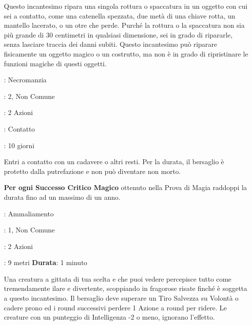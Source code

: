 \begin{multicols}{2}
Questo incantesimo ripara una singola rottura o spaccatura in un oggetto con cui sei a contatto, come una catenella spezzata, due metà di una chiave rotta, un mantello lacerato, o un otre che perde. Purché la rottura o la spaccatura non sia più grande di 30 centimetri in qualsiasi dimensione, sei in grado di ripararle, senza lasciare traccia dei danni subiti. Questo incantesimo può riparare fisicamente un oggetto magico o un costrutto, ma non è in grado di ripristinare le funzioni magiche di questi oggetti.

\noindent\colorbox{OBSSgold!10}{
\begin{minipage}{0.95\linewidth}
\begin{description}[noitemsep, topsep=0pt, parsep=0pt, partopsep=0pt, leftmargin=0cm, labelwidth=1.3cm]
	\item[\textbf{Lista}]: Necromanzia
	\item[\textbf{Livello}]: 2, Non Comune
	\item[\textbf{Lancio}]: 2 Azioni
	\item[\textbf{Gittata}]: Contatto
	\item[\textbf{Durata}]: 10 giorni
\end{description}
\end{minipage}}\smallskip

Entri a contatto con un cadavere o altri resti. Per la durata, il bersaglio è protetto dalla putrefazione e non può diventare non morto.

\textbf{Per ogni Successo Critico Magico} ottenuto nella Prova di Magia raddoppi la durata fino ad un massimo di un anno.

\noindent\colorbox{OBSSgold!10}{
\begin{minipage}{0.95\linewidth}
\begin{description}[noitemsep, topsep=0pt, parsep=0pt, partopsep=0pt, leftmargin=0cm, labelwidth=1.3cm]
	\item[\textbf{Lista}]: Ammaliamento
	\item[\textbf{Livello}]: 1, Non Comune
	\item[\textbf{Lancio}]: 2 Azioni
	\item[\textbf{Gittata}]: 9 metri
	\textbf{Durata}: 1 minuto
\end{description}
\end{minipage}}\smallskip

Una creatura a gittata di tua scelta e che puoi vedere percepisce tutto come tremendamente ilare e divertente, scoppiando in fragorose risate finché è soggetta a questo incantesimo. Il bersaglio deve superare un Tiro Salvezza su Volontà o cadere prono ed i round successivi perdere 1 Azione a round per ridere. Le creature con un punteggio di Intelligenza -2 o meno, ignorano l'effetto.


\end{multicols}
